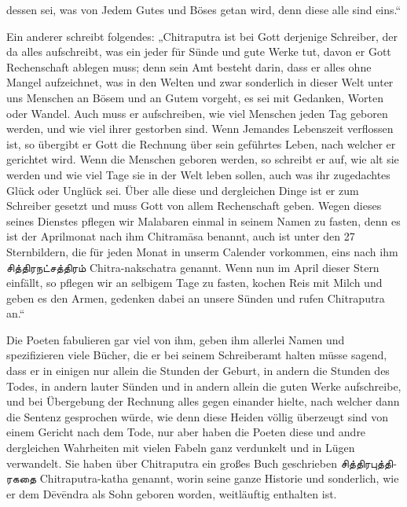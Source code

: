 \documentclass{article}
\newcommand{\TamilText}[1]{\texttamil{#1}}
\newcommand{\tam}[1]{\TamilText{#1}}
\begin{document}
dessen sei, was von Jedem Gutes und Böses getan wird, denn diese alle sind eins.“

Ein anderer schreibt folgendes: „Chitraputra ist bei Gott derjenige Schreiber, der da alles aufschreibt, was ein jeder für Sünde und gute Werke tut, davon er Gott Rechenschaft ablegen muss; denn sein Amt besteht darin, dass er alles ohne Mangel aufzeichnet, was in den Welten und zwar sonderlich in dieser Welt unter uns Menschen an Bösem und an Gutem vorgeht, es sei mit Gedanken, Worten oder Wandel. Auch muss er aufschreiben, wie viel Menschen jeden Tag geboren werden, und wie viel ihrer gestorben sind. Wenn Jemandes Lebenszeit verflossen ist, so übergibt er Gott die Rechnung über sein geführtes Leben, nach welcher er gerichtet wird. Wenn die Menschen geboren werden, so schreibt er auf, wie alt sie werden und wie viel Tage sie in der Welt leben sollen, auch was ihr zugedachtes Glück oder Unglück sei. Über alle diese und dergleichen Dinge ist er zum Schreiber gesetzt und muss Gott von allem Rechenschaft geben. Wegen dieses seines Dienstes pflegen wir Malabaren einmal in seinem Namen zu fasten, denn es ist der Aprilmonat nach ihm Chitram\={a}sa benannt, auch ist unter den 27 Sternbildern, die für jeden Monat in unserm Calender vorkommen, eins nach ihm \tam{சித்திரநட்சத்திரம்} Chitra-nakschatra genannt. Wenn nun im April dieser Stern einfällt, so pflegen wir an selbigem Tage zu fasten, kochen Reis mit Milch und geben es den Armen, gedenken dabei an unsere Sünden und rufen Chitraputra an.“

Die Poeten fabulieren gar viel von ihm, geben ihm allerlei Namen und spezifizieren viele Bücher, die er bei seinem Schreiberamt halten müsse sagend, dass er in einigen nur allein die Stunden der Geburt, in andern die Stunden des Todes, in andern lauter Sünden und in andern allein die guten Werke aufschreibe, und bei Übergebung der Rechnung alles gegen einander hielte, nach welcher dann die Sentenz gesprochen würde, wie denn diese Heiden völlig überzeugt sind von einem Gericht nach dem Tode, nur aber haben die Poeten diese und andre dergleichen Wahrheiten mit vielen Fabeln ganz verdunkelt und in Lügen verwandelt. Sie haben über Chitraputra ein großes Buch geschrieben \tam{சித்திரபுத்திரகதை} Chitraputra-katha genannt, worin seine ganze Historie und sonderlich, wie er dem D\={e}v\={e}ndra als Sohn geboren worden, weitläuftig enthalten ist.

\begin{center}
\end{center}
\end{document}
